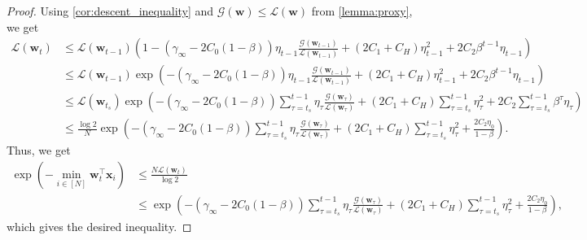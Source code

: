 \documentclass{article} %
\theoremstyle{plain}
\theoremstyle{definition}
\theoremstyle{remark}
\def\gG{{\mathcal{G}}}
\newcommand{\Ls}{\mathcal{L}}
\def\bx{{\mathbf x}}
\def\bw{{\mathbf w}}
\begin{document}
\begin{proof}
    Using \cref{cor:descent_inequality} and $\gG(\bw)\leq \Ls(\bw)$ from \cref{lemma:proxy}, we get
    \begin{align*}
        \Ls(\bw_t) &\leq \Ls(\bw_{t-1}) \left( 1- (\gamma_\infty - 2C_0(1-\beta)) \eta_{t-1} \frac{\gG(\bw_{t-1})}{\Ls(\bw_{t-1})} + (2C_1+C_H)\eta_{t-1}^2 + 2C_2 \beta^{t-1} \eta_{t-1}\right) \\ 
        &\leq \Ls(\bw_{t-1}) \exp \left(- (\gamma_\infty - 2C_0(1-\beta)) \eta_{t-1}  \frac{\gG(\bw_{t-1})}{\Ls(\bw_{t-1})} + (2C_1+C_H)\eta_{t-1}^2 + 2C_2 \beta^{t-1} \eta_{t-1} \right) \\
        &\leq \Ls(\bw_{t_s}) \exp \left(- (\gamma_\infty - 2C_0(1-\beta)) \sum_{\tau=t_s}^{t-1} \eta_{\tau}  \frac{\gG(\bw_\tau)}{\Ls(\bw_\tau)}  + (2C_1+C_H) \sum_{\tau=t_s}^{t-1} \eta_\tau^2 + 2C_2\sum_{\tau=t_s}^{t-1} \beta^{\tau}\eta_\tau\right) \\
        &\leq \frac{\log 2}{N} \exp \left(- (\gamma_\infty - 2C_0(1-\beta)) \sum_{\tau=t_s}^{t-1} \eta_{\tau}  \frac{\gG(\bw_\tau)}{\Ls(\bw_\tau)}  + (2C_1+C_H) \sum_{\tau=t_s}^{t-1} \eta_\tau^2 + \frac{2C_2\eta_0}{1-\beta}\right).
    \end{align*}
    Thus, we get
    \begin{align*}
        \exp(-\min_{i\in [N]} \bw_t^\top \bx_i)& \leq \frac{N \Ls(\bw_t)}{\log 2} \\
        &\leq \exp \left(- (\gamma_\infty - 2C_0(1-\beta)) \sum_{\tau=t_s}^{t-1} \eta_{\tau}  \frac{\gG(\bw_\tau)}{\Ls(\bw_\tau)}  + (2C_1+C_H) \sum_{\tau=t_s}^{t-1} \eta_\tau^2 + \frac{2C_2\eta_0}{1-\beta}\right),
    \end{align*}
    which gives the desired inequality.
\end{proof}
\end{document}
